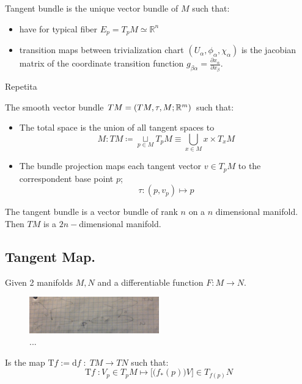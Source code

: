 \documentclass[a4paper,12pt]{scrartcl}    %
\begin{document}
\begin{TAM}
Tangent bundle is the unique vector bundle of $M$ such that:
\begin{itemize}
\item have for typical fiber $E_p = T_p M \simeq \mathbb{R}^n$
\item transition maps between trivialization chart $(U_\alpha , \phi_\alpha, \chi_\alpha )$ is the jacobian matrix of the coordinate transition function $ g_{\beta \alpha} = \frac{\partial x_\alpha}{\partial x_\beta}$.
\end{itemize}
\end{TAM}

	\danger Repetita
			\begin{definition}
				The smooth vector bundle $TM=(TM,\tau,M;\mathbb{R}^m)$ such that:
				\begin{itemize}
					\item The total space is the union of all tangent spaces to 
						$$M: TM \coloneqq \underset{p \in M}{\sqcup} T_pM  \equiv \bigcup_{x\in M} {x}\times T_x M$$
					\item The bundle projection maps each tangent vector $v\in  T_pM$ to the correspondent base point  $p$;
						$$\tau : (p,v_p) \mapsto p $$
				\end{itemize}
			\end{definition}	

\begin{observation}
The tangent bundle is a vector bundle of rank $n$ on a $n$ dimensional manifold.
\\
Then $TM$ is a $2n-$dimensional manifold.
\end{observation}

\subsection{Tangent Map.}
Given 2 manifolds $M,N$ and a differentiable function $F:M\rightarrow N$.

\begin{figure}[h!]
  \caption{...}\label{fig:TangentMap}
  	\includegraphics[width=0.5\textwidth]{TempPictures/TangentMap.jpg}
  \centering
\end{figure}

\begin{definition}
Is the map $\textrm{T}f := \textrm{d}f \; : \; TM \rightarrow TN$ such that:
\begin{displaymath}
\textrm{T}f \; : V_p \in T_pM \mapsto \big[ \big( f_*(p) \big) V \big] \in T_{f(p)}N
\end{displaymath}

\end{definition}
\end{document}

